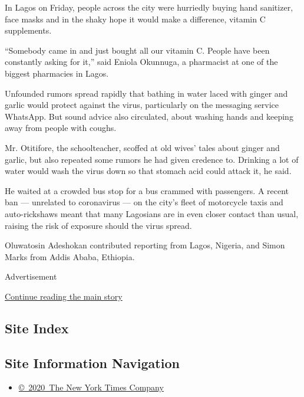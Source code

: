 In Lagos on Friday, people across the city were hurriedly buying hand
sanitizer, face masks and in the shaky hope it would make a difference,
vitamin C supplements.

``Somebody came in and just bought all our vitamin C. People have been
constantly asking for it,'' said Eniola Okunnuga, a pharmacist at one of
the biggest pharmacies in Lagos.

Unfounded rumors spread rapidly that bathing in water laced with ginger
and garlic would protect against the virus, particularly on the
messaging service WhatsApp. But sound advice also circulated, about
washing hands and keeping away from people with coughs.

Mr. Otitifore, the schoolteacher, scoffed at old wives' tales about
ginger and garlic, but also repeated some rumors he had given credence
to. Drinking a lot of water would wash the virus down so that stomach
acid could attack it, he said.

He waited at a crowded bus stop for a bus crammed with passengers. A
recent ban --- unrelated to coronavirus --- on the city's fleet of
motorcycle taxis and auto-rickshaws meant that many Lagosians are in
even closer contact than usual, raising the risk of exposure should the
virus spread.

Oluwatosin Adeshokan contributed reporting from Lagos, Nigeria, and
Simon Marks from Addis Ababa, Ethiopia.

Advertisement

\protect\hyperlink{after-bottom}{Continue reading the main story}

\hypertarget{site-index}{%
\subsection{Site Index}\label{site-index}}

\hypertarget{site-information-navigation}{%
\subsection{Site Information
Navigation}\label{site-information-navigation}}

\begin{itemize}
\tightlist
\item
  \href{https://help.nytimes.com/hc/en-us/articles/115014792127-Copyright-notice}{©~2020~The
  New York Times Company}
\end{itemize}

